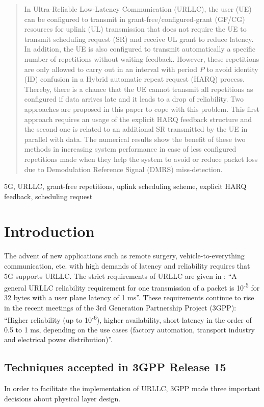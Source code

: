 \documentclass[conference]{IEEEtran}
\begin{document}
\begin{abstract}
In Ultra-Reliable Low-Latency Communication (URLLC), the user (UE) can be configured to transmit in grant-free/configured-grant (GF/CG) resources for  uplink (UL) transmission that does not require the UE to transmit scheduling request (SR) and receive UL grant to reduce latency. In addition, the UE is also configured to transmit automatically a specific number of repetitions without waiting feedback. However, these repetitions are only allowed to carry out in an interval with period $P$ to avoid identity (ID) confusion in a Hybrid automatic repeat request (HARQ) process. Thereby, there is a chance that the UE cannot transmit all repetitions as configured if data arrives late and it leads to a drop of reliability. Two approaches are proposed in this paper to cope with this problem. This first approach requires an usage of the explicit HARQ feedback structure and the second one is related to an additional SR transmitted by the UE in parallel with data. The numerical results show the benefit of these two methods in increasing system performance in case of less configured repetitions made when they help the system to avoid or reduce packet loss due to Demodulation Reference Signal (DMRS) miss-detection.
\end{abstract}

\begin{IEEEkeywords}
5G, URLLC, grant-free repetitions, uplink scheduling scheme, explicit HARQ feedback, scheduling request
\end{IEEEkeywords}

\section{Introduction} \label{I}
The advent of new applications such as remote surgery, vehicle-to-everything communication, etc. with high demands of latency and reliability requires that 5G supports URLLC. The strict requirements of URLLC are given in \cite{b6}: ``A general URLLC reliability requirement for one transmission of a packet is 10\textsuperscript{-5} for 32 bytes with a user plane latency of 1 ms''. These requirements continue to rise in the recent meetings of the 3rd Generation Partnership  Project  (3GPP): ``Higher reliability (up to 10\textsuperscript{-6}), higher availability, short latency in the order of 0.5 to 1 ms, depending on the use cases (factory automation, transport industry and electrical power distribution)''\cite{b8}.

\subsection{Techniques accepted in 3GPP Release 15}\label{IAA}
In order to facilitate the implementation of URLLC, 3GPP made three important decisions about physical layer design.
\end{document}
